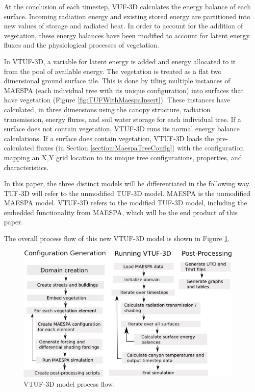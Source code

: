 \documentclass[preprint,12pt,authoryear]{elsarticle}
\begin{document}
At the conclusion of each timestep, VUF-3D calculates the energy balance of each surface. Incoming radiation energy and existing stored energy are partitioned into new values of storage and radiated heat. In order to account for the addition of vegetation, these energy balances have been modified to account for latent energy fluxes and the physiological processes of vegetation. 

In VTUF-3D, a variable for latent energy is added and energy allocated to it from the pool of available energy. The vegetation is treated as a flat two dimensional ground surface tile. This is done by tiling multiple instances of MAESPA (each individual tree with its unique configuration) into surfaces that have vegetation (Figure \ref{fig:TUFWithMaespaInsert}). These instances have calculated, in three dimensions using the canopy structure, radiation transmission, energy fluxes, and soil water storage for each individual tree. If a surface does not contain vegetation, VTUF-3D runs its normal energy balance calculations. If a surface does contain vegetation, VTUF-3D loads the pre-calculated fluxes (in Section \ref{section:MaespaTreeConfig}) with the configuration mapping an X,Y grid location to its unique tree configurations, properties, and characteristics.

In this paper, the three distinct models will be differentiated in the following way. TUF-3D will refer to the unmodified TUF-3D model. MAESPA is the unmodified MAESPA model. VTUF-3D refers to the modified TUF-3D model, including the embedded functionality from MAESPA, which will be the end product of this paper. 

The overall process flow of this new VTUF-3D model is shown in Figure \ref{fig:vtufprocessflow}.

\begin{figure}[htbp]
  \centering
  \includegraphics[trim=0mm 0mm 0mm 0mm, clip, scale=0.75]{images/VTUF-3DProcessFlow.png}
  \caption[VTUF-3D model process flow]{VTUF-3D model process flow. \label{fig:vtufprocessflow}}
\end{figure}
\end{document}
